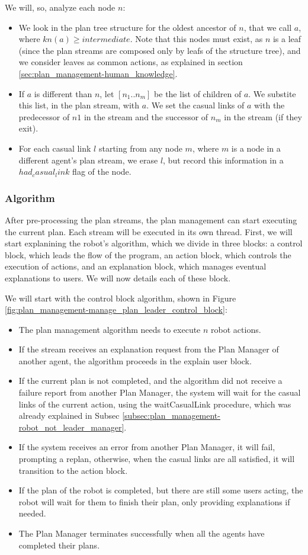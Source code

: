 We will, so, analyze each node $n$:
\begin{itemize}
\item We look in the plan tree structure for the oldest ancestor of $n$, that we call $a$, where $kn(a) \geq intermediate$. Note that this nodes must exist, as $n$ is a leaf (since the plan streams are composed only by leafs of the structure tree), and we consider leaves as common actions, as explained in section \ref{sec:plan_management-human_knowledge}.
\item If $a$ is different than $n$, let $[n_1..n_m]$ be the list of children of $a$. We substite this list, in the plan stream, with $a$. We set the casual links of $a$ with the predecessor of $n1$ in the stream and the successor of $n_m$ in the stream (if they exit).
\item For each casual link $l$ starting from any node $m$, where $m$ is a node in a different agent's plan stream, we erase $l$, but record this information in a $had_casual_link$ flag of the node.
\end{itemize}


\subsubsection{Algorithm}
After pre-processing the plan streams, the plan management can start executing the current plan. Each stream will be executed in its own thread. First, we will start explanining the robot's algorithm, which we divide in three blocks: a control block, which leads the flow of the program, an action block, which controls the execution of actions, and an explanation block, which manages eventual explanations to users. We will now details each of these block.

We will start with the control block algorithm, shown in Figure \ref{fig:plan_management-manage_plan_leader_control_block}:
\begin{itemize}
\item The plan management algorithm needs to execute $n$ robot actions.
\item If the stream receives an explanation request from the Plan Manager of another agent, the algorithm proceeds in the explain user block.
\item If the current plan is not completed, and the algorithm did not receive a failure report from another Plan Manager, the system will wait for the casual links of the current action, using the waitCasualLink procedure, which was already explained in Subsec \ref{subsec:plan_management-robot_not_leader_manager}.
\item If the system receives an error from another Plan Manager, it will fail, prompting a replan, otherwise, when the casual links are all satisfied, it will transition to the action block.
\item If the plan of the robot is completed, but there are still some users acting, the robot will wait for them to finish their plan, only providing explanations if needed.
\item The Plan Manager terminates successfully when all the agents have completed their plans.
\end{itemize}


